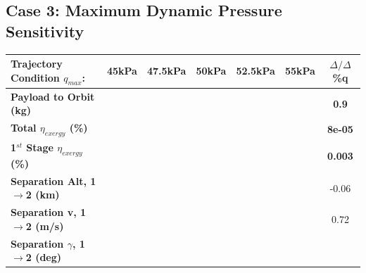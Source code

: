 \subsection{Case 3: Maximum Dynamic Pressure Sensitivity}\label{sec:qvariation}



\begin{table}[ht!] %
	\centering
	\begin{tabular}{l c c c c c c} 
		\hline \textbf{Trajectory Condition  \qquad  $q_{max}$: }
		&45kPa
		&47.5kPa
		&50kPa
		& 52.5kPa
		& 55kPa
		& $\Delta/\Delta$\%q
	\\
	\hline \textbf{Payload to Orbit (kg)}
	& \textbf{\PayloadToOrbitqFortyFiveNoReturn}
	& \textbf{\PayloadToOrbitqFortySevenNoReturn}
	& \textbf{\PayloadToOrbitqStandardNoReturn}
	& \textbf{\PayloadToOrbitqFiftyTwoNoReturn}
	& \textbf{\PayloadToOrbitqFiftyFiveNoReturn}
	&\textbf{0.9}
	\\
	\textbf{Total $\eta_{exergy}$ (\%)}
	& \textbf{\totalExergyEffqFortyFiveNoReturn}
	& \textbf{\totalExergyEffqFortySevenNoReturn}
	& \textbf{\totalExergyEffqStandardNoReturn}
	& \textbf{\totalExergyEffqFiftyTwoNoReturn}
	& \textbf{\totalExergyEffqFiftyFiveNoReturn}
	& \textbf{8e-05}
	\\
	\hline 
	\textbf{1$^{st}$ Stage $\eta_{exergy}$ (\%)}
	& \textbf{\firstExergyEffqFortyFiveNoReturn}
	& \textbf{\firstExergyEffqFortySevenNoReturn}
	& \textbf{\firstExergyEffqStandardNoReturn}
	& \textbf{\firstExergyEffqFiftyTwoNoReturn}
	& \textbf{\firstExergyEffqFiftyFiveNoReturn}
	& \textbf{0.003}
	\\
	\textbf{Separation Alt, 1$\rightarrow$2 (km)}
	& \firstsecondSeparationAltqFortyFiveNoReturn
	& \firstsecondSeparationAltqFortySevenNoReturn
	& \firstsecondSeparationAltqStandardNoReturn
	& \firstsecondSeparationAltqFiftyTwoNoReturn
	& \firstsecondSeparationAltqFiftyFiveNoReturn
	&-0.06
	\\
	\textbf{Separation v, 1$\rightarrow$2 (m/s)}
	& \firstsecondSeparationvqFortyFiveNoReturn
	& \firstsecondSeparationvqFortySevenNoReturn
	& \firstsecondSeparationvqStandardNoReturn
	& \firstsecondSeparationvqFiftyTwoNoReturn
	& \firstsecondSeparationvqFiftyFiveNoReturn
	&0.72
	\\
	\textbf{Separation $\gamma$, 1$\rightarrow$2 (deg)}
	& \firstsecondSeparationgammaqFortyFiveNoReturn
	& \firstsecondSeparationgammaqFortySevenNoReturn
	& \firstsecondSeparationgammaqStandardNoReturn
	& \firstsecondSeparationgammaqFiftyTwoNoReturn
	& \firstsecondSeparationgammaqFiftyFiveNoReturn

\end{tabular}
\end{table}
